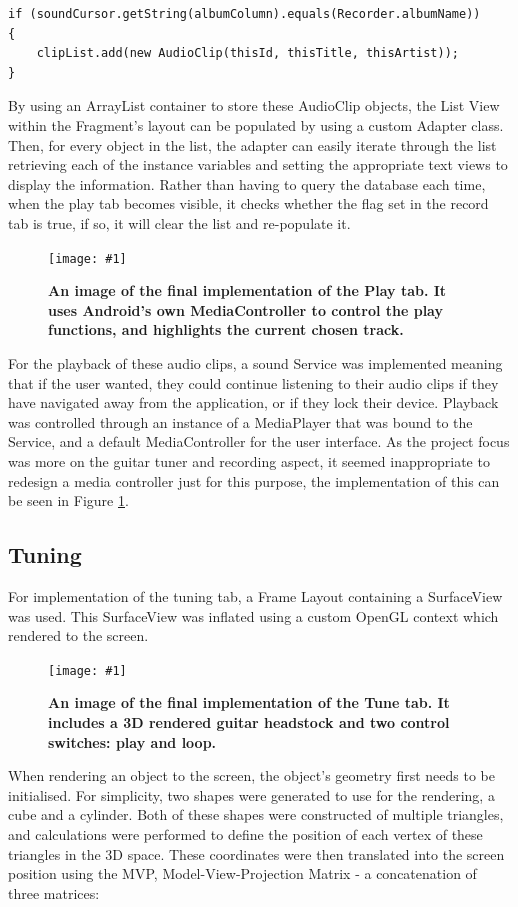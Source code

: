 \documentclass[conference]{acmsiggraph}
\newcommand{\figuremacroF}[3]{
	\begin{figure}[H] %
		\centering
		\texttt{[image: \#1]}
		\caption[#2]{\textbf{#2}}
		\label{fig:#1}
	\end{figure}
}
\begin{document}
\begin{lstlisting}[label = {lst:query}, caption={Conditional Statement for Creating Audio Clips}]
if (soundCursor.getString(albumColumn).equals(Recorder.albumName))
{
	clipList.add(new AudioClip(thisId, thisTitle, thisArtist));
}
\end{lstlisting}

By using an ArrayList container to store these AudioClip objects, the List View within the Fragment's layout can be populated by using a custom Adapter class. Then, for every object in the list, the adapter can easily iterate through the list retrieving each of the instance variables and setting the appropriate text views to display the information. Rather than having to query the database each time, when the play tab becomes visible, it checks whether the flag set in the record tab is true, if so, it will clear the list and re-populate it. 

\figuremacroF
{playback}
{An image of the final implementation of the Play tab. It uses Android's own MediaController to control the play functions, and highlights the current chosen track.}
{0.65}

For the playback of these audio clips, a sound Service was implemented meaning that if the user wanted, they could continue listening to their audio clips if they have navigated away from the application, or if they lock their device. Playback was controlled through an instance of a MediaPlayer that was bound to the Service, and a default MediaController for the user interface. As the project focus was more on the guitar tuner and recording aspect, it seemed inappropriate to redesign a media controller just for this purpose, the implementation of this can be seen in Figure \ref{fig:playback}.

\subsection{Tuning}

For implementation of the tuning tab, a Frame Layout containing a SurfaceView was used. This SurfaceView was inflated using a custom OpenGL context which rendered to the screen. \cite{OpenGL}

\figuremacroF
{tuner}
{An image of the final implementation of the Tune tab. It includes a 3D rendered guitar headstock and two control switches: play and loop.}
{0.65}

When rendering an object to the screen, the object's geometry first needs to be initialised. For simplicity, two shapes were generated to use for the rendering, a cube and a cylinder. Both of these shapes were constructed of multiple triangles, and calculations were performed to define the position of each vertex of these triangles in the 3D space. These coordinates were then translated into the screen position using the MVP, Model-View-Projection Matrix - a concatenation of three matrices:
\end{document}
